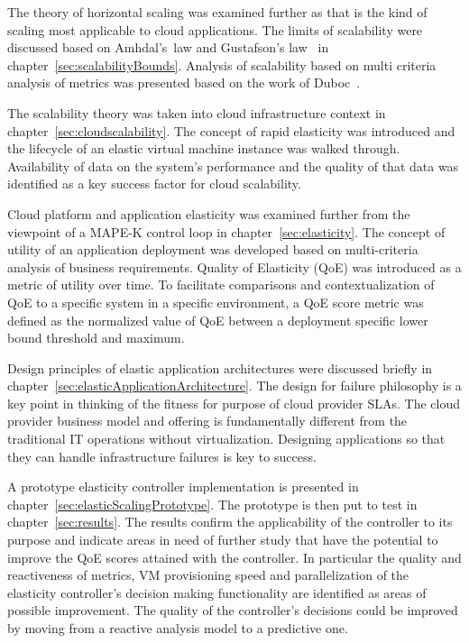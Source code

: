 \documentclass[english]{tktltiki2}
\theoremstyle{definition}
\theoremstyle{remark}
\begin{document}
The theory of horizontal scaling was examined further as that is the kind of
scaling most applicable to cloud applications. The limits of scalability were
discussed based on Amhdal's~law \cite{amdahlslaw} and Gustafson's
law~\cite{gustafsonslaw} in chapter~\ref{sec:scalabilityBounds}. Analysis of
scalability based on multi criteria analysis of metrics was presented based on
the work of Duboc~\cite{Duboc2007}.

The scalability theory was taken into cloud infrastructure context in
chapter~\ref{sec:cloudscalability}. The concept of rapid elasticity was
introduced and the lifecycle of an elastic virtual machine instance was
walked through. Availability of data on the system's performance and the quality of
that data was identified as a key success factor for cloud scalability.

Cloud platform and application elasticity was examined further from the
viewpoint of a MAPE-K control loop in chapter~\ref{sec:elasticity}. The concept
of utility of an application deployment was developed based on multi-criteria
analysis of business requirements. Quality of Elasticity (QoE) was introduced as
a metric of utility over time. To facilitate comparisons and contextualization
of QoE to a specific system in a specific environment, a QoE score metric was
defined as the normalized value of QoE between a deployment specific lower bound
threshold and maximum.

Design principles of elastic application architectures were discussed briefly in
chapter~\ref{sec:elasticApplicationArchitecture}. The design for failure
philosophy is a key point in thinking of the fitness for purpose of cloud
provider SLAs. The cloud provider business model and offering is fundamentally
different from the traditional IT operations without virtualization. Designing
applications so that they can handle infrastructure failures is key to success.

A prototype elasticity controller implementation  is presented in
chapter~\ref{sec:elasticScalingPrototype}. The prototype is then put to test in
chapter~\ref{sec:results}. The results confirm the applicability of the
controller to its purpose and indicate areas in need of further study that have
the potential to improve the QoE scores attained with the controller. In
particular the quality and reactiveness of metrics, VM provisioning speed and
parallelization of the elasticity controller's decision making functionality are
identified as areas of possible improvement. The quality of the controller's
decisions could be improved by moving from a reactive analysis model to a
predictive one.
\end{document}
